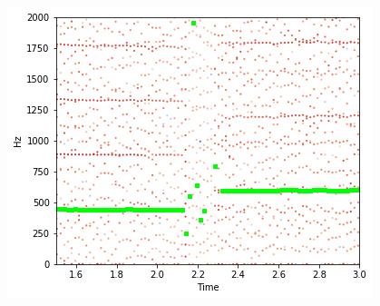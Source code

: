 \begin{frame}
\begin{columns}
\begin{column}{0.5\textwidth}
			\includegraphics[width=\textwidth]{images/f0-flute.png}
		\end{column}
	\end{columns}			
\end{frame}

